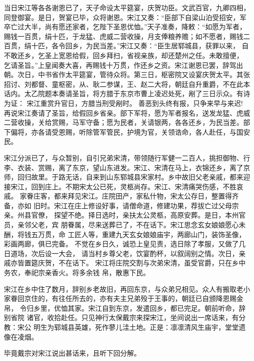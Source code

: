 当日宋江等各各谢恩已了，天子命设太平筵宴，庆贺功臣。文武百官，九卿四相，
同登御宴。是日，贺宴已毕，众将谢恩。宋江又奏：“臣部下自梁山泊受招安，军
卒亡过大半，尚有愿还家者，乞陛下圣恩优恤。”天子准奏，降敕：“如愿为军者，
赐钱一百贯，绢十匹，于龙猛、虎威二营收操，月支俸粮养赡；如不愿者，赐钱二
百贯，绢十匹，各令回乡，为民当差。”宋江又奏：“臣生居郓城县，获罪以来，
自不敢还乡，乞圣上宽恩给假，回乡拜扫，省视亲族，却还楚州之任。未敢擅便，
乞请圣旨。”上皇闻奏大喜，再赐钱十万贯，作还乡之资。宋江谢恩已罢，辞驾出
朝。次日，中书省作太平筵宴，管待众将。第三日，枢密院又设宴庆贺太平。其张
招讨、刘都督、童枢密，从、耿二参谋，王、赵二大将，朝廷自升重爵，不在此本
话内。太乙院题本奏请圣旨，将方腊于东京市曹上凌迟处死，剐了三日示众。有诗
为证：
宋江重赏升官日，方腊当刑受剐时。
善恶到头终有报，只争来早与来迟!
再说宋江奏请了圣旨，给假回乡省亲。部下军将，愿为军者报名，送发龙猛、虎威
二营收操，关给赏赐，马军守备；愿为民者，关请银两，各各还乡，为民当差。部
下偏将，亦各请受恩赐，听除管军管民，护境为官，关领诰命，各人赴任，与国安
民。

宋江分派已了，与众暂别，自引兄弟宋清，带领随行军健一二百人，挑担御物、行
李、衣装、赏赐，离了东京，望山东进发。宋江、宋清在马上，衣锦还乡，离了京
师，回归故里。于路无话，自来到山东郓城县宋家村。乡中故旧父老亲戚，都来迎
接宋江，回到庄上。不期宋太公已死，灵柩尚存。宋江、宋清痛哭伤感，不胜哀戚。
家眷庄客，都来拜见宋江。庄院田产，家私什物，宋太公存日，整置得齐备，亦如
旧时。宋江在庄上修设好事，请僧命道，修建功果，荐拔亡过父母宗亲。州县官僚，
探望不绝。择日选时，亲扶太公灵柩，高原安葬。是日，本州官员，亲邻父老，宾
朋眷属，尽来送葬已了，不在话下。宋江思念玄女娘娘愿心未酬，将钱五万贯，命
工匠人等，重建九天玄女娘娘庙宇，两廊山门，装饰圣像，彩画两廊，俱已完备。
不觉在乡日久，诚恐上皇见责，选日除了孝服，又做了几日道场，次后设一大会，
请当村乡尊父老，饮宴酌杯，以叙阔别之情。次日，亲戚亦皆置筵庆贺，不在话下。
宋江将庄院交割与次弟宋清，虽受官爵，只在乡中务农，奉祀宗亲香火。将多余钱
帛，散惠下民。

宋江在乡中住了数月，辞别乡老故旧，再回东京，与众弟兄相见。众人有搬取老小
家眷回京住的，有往任所去的，亦有夫主兄弟殁于王事的，朝廷已自颁降恩赐金帛，
令归乡里，优恤其家。宋江自到东京，发遣回乡，都已完足。朝前听命，辞别省院
诸官，收拾赴任。只见神行太保戴宗来探宋江，坐间说出一席话来，有分教：宋公
明生为郓城县英雄，死作蓼儿洼土地。正是：凛凛清风生庙宇，堂堂遗像在凌烟。

毕竟戴宗对宋江说出甚话来，且听下回分解。